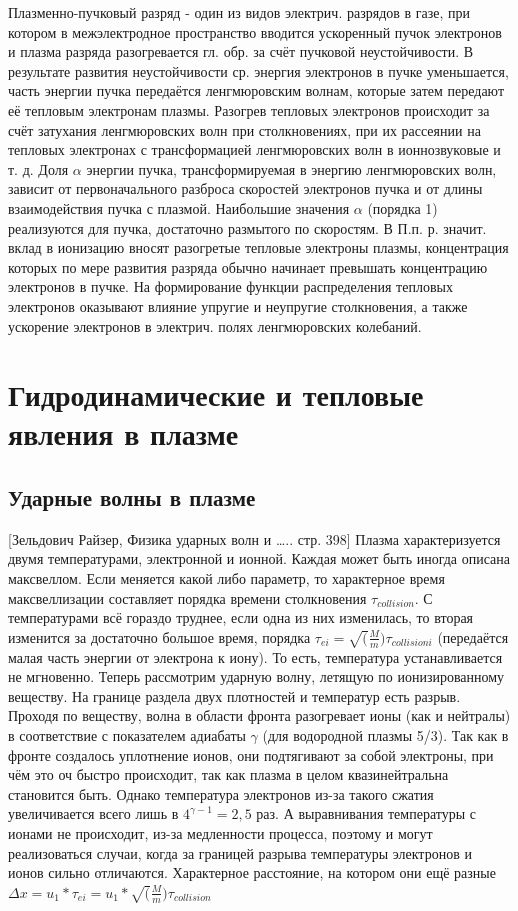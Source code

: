 \documentclass[10pt, a4paper]{article}
\let\stdsection\section
\renewcommand\section{\newpage\stdsection}
\begin{document}
Плазменно-пучковый разряд - один из видов электрич. разрядов в газе, при котором в межэлектродное пространство вводится ускоренный пучок электронов и плазма разряда разогревается гл. обр. за счёт пучковой неустойчивости. В результате развития неустойчивости ср. энергия электронов в пучке уменьшается, часть энергии пучка передаётся ленгмюровским волнам, которые затем передают её тепловым электронам плазмы. Разогрев тепловых электронов происходит за счёт затухания ленгмюровских волн при столкновениях, при их рассеянии на тепловых электронах с трансформацией ленгмюровских волн в ионнозвуковые и т. д.
Доля $\alpha$ энергии пучка, трансформируемая в энергию ленгмюровских волн, зависит от первоначального разброса скоростей электронов пуч­ка и от длины взаимодействия пучка с плазмой. Наибольшие значения $\alpha$  (порядка 1) реализуются для пучка, достаточно размытого по скоростям.
В П.п. р. значит. вклад в ионизацию вносят разогретые тепловые электроны плазмы, концентрация которых по мере развития разряда обычно начинает превышать концентрацию электронов в пучке. На формирование функции распределения тепловых электронов оказывают влияние упругие и неупругие столкновения, а так­же ускорение электронов в электрич. полях ленгмюровских колебаний.


\section{ Гидродинамические и тепловые явления в плазме}

\subsection{Ударные волны в плазме}

[Зельдович Райзер, Физика ударных волн и ….. стр. 398]
Плазма характеризуется двумя температурами, электронной и ионной. Каждая может быть иногда описана максвеллом. Если меняется какой либо параметр, то характерное время максвеллизации составляет порядка времени столкновения $\tau_{collision}$. С температурами всё гораздо труднее, если одна из них изменилась, то вторая изменится за достаточно большое время, порядка $\tau_{ei}=\sqrt(\frac{M}{m}) \tau_{collision i}$ (передаётся малая часть энергии от электрона к иону). То есть, температура устанавливается не мгновенно.
Теперь рассмотрим ударную волну, летящую по ионизированному веществу.
На границе раздела двух плотностей и температур есть разрыв. Проходя по веществу, волна в области фронта разогревает ионы (как и нейтралы) в соответствие с показателем адиабаты $\gamma$ (для водородной плазмы 5/3). Так как в фронте создалось уплотнение ионов, они подтягивают за собой электроны, при чём это оч быстро происходит, так как плазма в целом квазинейтральна становится быть. Однако температура электронов из-за такого сжатия увеличивается всего лишь в $4^{\gamma - 1}=2,5$ раз. А выравнивания температуры с ионами не происходит, из-за медленности процесса, поэтому и могут реализоваться случаи, когда за границей разрыва температуры электронов и ионов сильно отличаются. Характерное расстояние, на котором они ещё разные $\Delta x = u_1*\tau_{ei} =u_1* \sqrt(\frac{M}{m}) \tau_{collision}$
\end{document}
